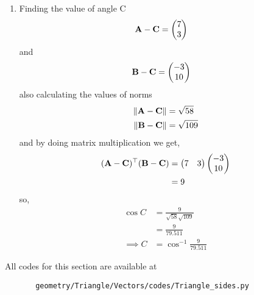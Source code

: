 \documentclass[10pt]{book}
\begin{document}
\begin{enumerate}[label=\thesection.\arabic*.,ref=\thesection.\theenumi]
\begin{enumerate}
\item Finding the value of angle C
\begin{align}
 \mathbf{A}-\mathbf{C} &=\begin{pmatrix}7\\3\end{pmatrix}
\end{align}
and 
\begin{align}
 \mathbf{B}-\mathbf{C} &= \begin{pmatrix}-3\\10\end{pmatrix}
\end{align}
also calculating the values of norms
\begin{align}
 \left\lVert\mathbf{A}-\mathbf{C}\right\rVert &= \sqrt{58}\\
	\left\lVert\mathbf{B}-\mathbf{C}\right\rVert &= \sqrt{109}
\end{align}
and by doing matrix multiplication we get,
\begin{align}
\begin{split}
 (\mathbf{A}-\mathbf{C})^{\top}(\mathbf{B}-\mathbf{C}) &= \begin{pmatrix}7&3\end{pmatrix}\begin{pmatrix}-3\\10\end{pmatrix}\\
 &= 9
\end{split}
\end{align}
so, 
\begin{align}
\cos{C} &= \frac{9}{{\sqrt{58}} \sqrt{109}}\\
 &= \frac{9}{79.511}\\
\implies C &= \cos^{-1}{\frac{9}{79.511}}
\end{align}
\end{enumerate} 
All codes for this section are available at 
\begin{lstlisting}
       geometry/Triangle/Vectors/codes/Triangle_sides.py
\end{lstlisting}
\end{enumerate}
\backmatter
\appendix
\latexprintindex
\end{document}
